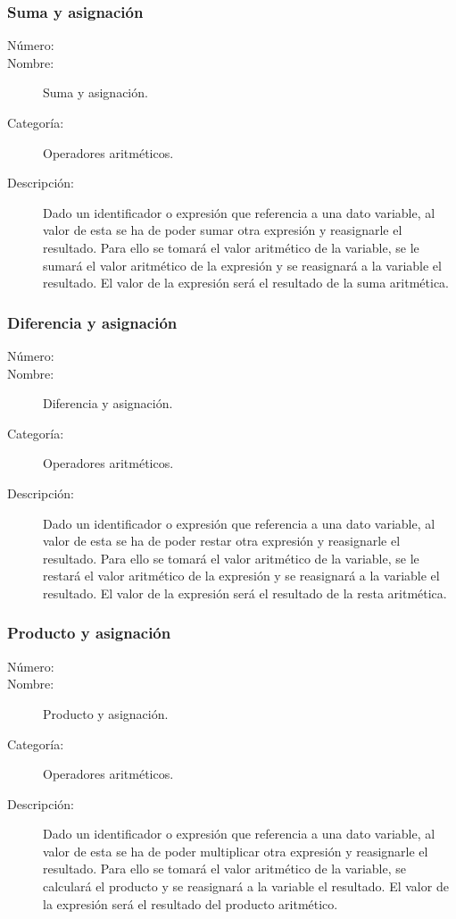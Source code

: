 \subsubsection{Suma y asignación}
	\begin{description}
		\item [Número:] \cn
		\item [Nombre:] Suma y asignación.
		\item [Categoría:] Operadores aritméticos.
		\item [Descripción:] Dado un identificador o expresión que referencia a una dato variable, al valor de esta se ha de poder sumar otra expresión
		y reasignarle el resultado. Para ello se tomará el valor aritmético de la variable, se le sumará el valor aritmético de la expresión
		y se reasignará a la variable el resultado. El valor de la expresión será el resultado de la suma aritmética.
	\end {description}

\subsubsection{Diferencia y asignación}
	\begin{description}
		\item [Número:] \cn
		\item [Nombre:] Diferencia y asignación.
		\item [Categoría:] Operadores aritméticos.
		\item [Descripción:] Dado un identificador o expresión que referencia a una dato variable, al valor de esta se ha de poder restar otra expresión
		y reasignarle el resultado. Para ello se tomará el valor aritmético de la variable, se le restará el valor aritmético de la expresión
		y se reasignará a la variable el resultado. El valor de la expresión será el resultado de la resta aritmética.
	\end {description}

\subsubsection{Producto y asignación}
	\begin{description}
		\item [Número:] \cn
		\item [Nombre:] Producto y asignación.
		\item [Categoría:] Operadores aritméticos.
		\item [Descripción:] Dado un identificador o expresión que referencia a una dato variable, al valor de esta se ha de poder multiplicar
		otra expresión y reasignarle el resultado. Para ello se tomará el valor aritmético de la variable, se calculará el producto  y se reasignará a la variable el resultado. El valor de la expresión será el resultado del producto aritmético.
	\end {description}

